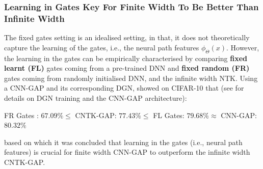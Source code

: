 \subsubsection{Learning in Gates Key For Finite Width To Be Better Than Infinite Width}\label{sec:gatelearning}
The fixed gates setting is an idealised setting, in that, it does not theoretically capture the learning of the gates, i.e., the neural path features $\phi_{\Theta}(x)$. However, the learning in the gates can be empirically characterised by comparing \textbf{fixed learnt (FL)}  gates coming from a pre-trained DNN and \textbf{fixed random (FR)} gates coming from randomly initialised DNN, and the infinite width NTK.  Using a CNN-GAP and its corresponding DGN, \cite{npk} showed on CIFAR-10 that (see  for details on DGN training and the CNN-GAP architecture):

{\centering FR Gates : $\mathbf{67.09\%}\leq $ CNTK-GAP: $\mathbf{77.43\%}\leq $ FL Gates: $\mathbf{79.68\%}\approx $ CNN-GAP: $\mathbf{80.32\%}$\par}

based on which it was concluded that learning in the gates (i.e., neural path features) is crucial for finite width CNN-GAP to outperform the infinite width CNTK-GAP.%


